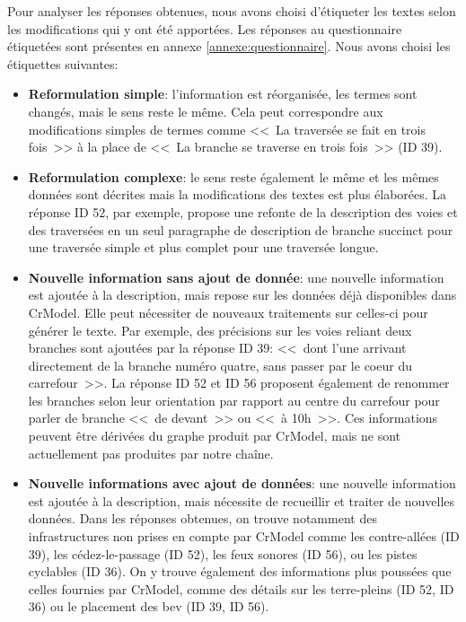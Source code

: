 \newpar{}

Pour analyser les réponses obtenues, nous avons choisi d'étiqueter les textes selon les modifications qui y ont été apportées. Les réponses au questionnaire étiquetées sont présentes en annexe \ref{annexe:questionnaire}. Nous avons choisi les étiquettes suivantes:

\begin{itemize}
    \item \textbf{Reformulation simple}: l'information est réorganisée, les termes sont changés, mais le sens reste le même. Cela peut correspondre aux modifications simples de termes comme <<~La traversée se fait en trois fois~>> à la place de <<~La branche se traverse en trois fois~>> (ID 39).
    \item \textbf{Reformulation complexe}: le sens reste également le même et les mêmes données sont décrites mais la modifications des textes est plus élaborées. La réponse ID 52, par exemple, propose une refonte de la description des voies et des traversées en un seul paragraphe de description de branche succinct pour une traversée simple et plus complet pour une traversée longue.
    \item \textbf{Nouvelle information sans ajout de donnée}: une nouvelle information est ajoutée à la description, mais repose sur les données déjà disponibles dans CrModel. Elle peut nécessiter de nouveaux traitements sur celles-ci pour générer le texte. Par exemple, des précisions sur les voies reliant deux branches sont ajoutées par la réponse ID 39: <<~dont l’une arrivant directement de la branche numéro quatre, sans passer par le coeur du carrefour~>>. La réponse ID 52 et ID 56 proposent également de renommer les branches selon leur orientation par rapport au centre du carrefour pour parler de branche <<~de devant~>> ou <<~à 10h~>>. Ces informations peuvent être dérivées du graphe produit par CrModel, mais ne sont actuellement pas produites par notre chaîne.
    \item \textbf{Nouvelle informations avec ajout de données}: une nouvelle information est ajoutée à la description, mais nécessite de recueillir et traiter de nouvelles données. Dans les réponses obtenues, on trouve notamment des infrastructures non prises en compte par CrModel comme les contre-allées (ID 39), les cédez-le-passage (ID 52), les feux sonores (ID 56), ou les pistes cyclables (ID 36). On y trouve également des informations plus poussées que celles fournies par CrModel, comme des détails sur les terre-pleins (ID 52, ID 36) ou le placement des \gls{bev} (ID 39, ID 56).
\end{itemize}


